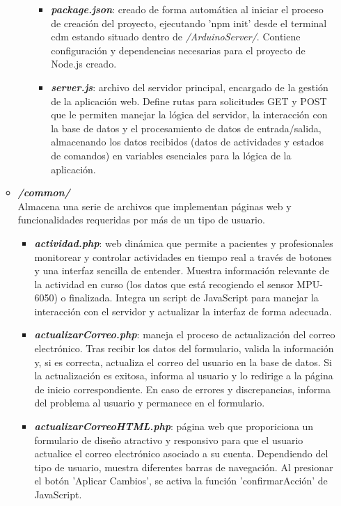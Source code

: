 \begin{itemize}
\begin{itemize}
\begin{itemize}
\begin{itemize}
                \item \textbf{\textit{package.json}}: creado de forma automática al iniciar el proceso de creación del proyecto, ejecutando 'npm init' desde el terminal cdm estando situado dentro de \textit{/ArduinoServer/}. Contiene configuración y dependencias necesarias para el proyecto de Node.js creado.
                \item \textbf{\textit{server.js}}: archivo del servidor principal, encargado de la gestión de la aplicación web. Define rutas para solicitudes GET y POST que le permiten manejar la lógica del servidor, la interacción con la base de datos y el procesamiento de datos de entrada/salida, almacenando los datos recibidos (datos de actividades y estados de comandos) en variables esenciales para la lógica de la aplicación.
            \end{itemize}
        \end{itemize}
        \item \textbf{\textit{/common/}}\\
        Almacena una serie de archivos que implementan páginas web y funcionalidades requeridas por más de un tipo de usuario. 
        \begin{itemize}
            \item \textbf{\textit{actividad.php}}: web dinámica que permite a pacientes y profesionales monitorear y controlar actividades en tiempo real a través de botones y una interfaz sencilla de entender. Muestra información relevante de la actividad en curso (los datos que está recogiendo el sensor MPU-6050) o finalizada. Integra un script de JavaScript para manejar la interacción con el servidor y actualizar la interfaz de forma adecuada.
            \item \textbf{\textit{actualizarCorreo.php}}: maneja el proceso de actualización del correo electrónico. Tras recibir los datos del formulario, valida la información y, si es correcta, actualiza el correo del usuario en la base de datos. Si la actualización es exitosa, informa al usuario y lo redirige a la página de inicio correspondiente. En caso de errores y discrepancias, informa del problema al usuario y permanece en el formulario.
            \item \textbf{\textit{actualizarCorreoHTML.php}}: página web que proporiciona un formulario de diseño atractivo y responsivo para que el usuario actualice el correo electrónico asociado a su cuenta. Dependiendo del tipo de usuario, muestra diferentes barras de navegación. Al presionar el botón 'Aplicar Cambios', se activa la función 'confirmarAcción' de JavaScript.

\end{itemize}
\end{itemize}
\end{itemize}
